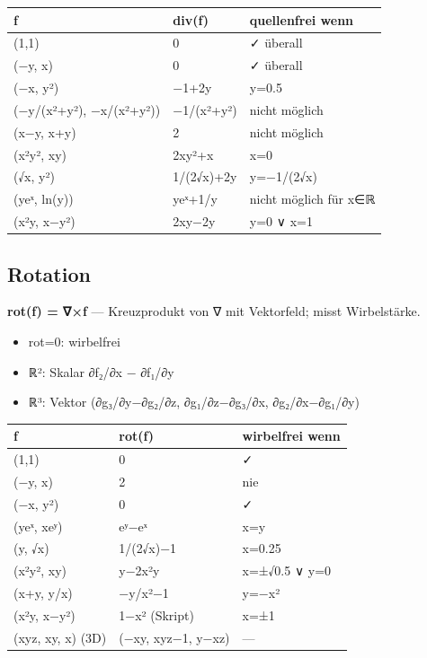 \documentclass[11pt, a4paper]{article}
\begin{document}
{\small
\begin{tabularx}{\linewidth}{XXX}
\hline
\rowcolor{tableheadbg}
{\color{white}\textbf{f}} & {\color{white}\textbf{div(f)}} & {\color{white}\textbf{quellenfrei wenn}} \\[2pt]
\hline
\endhead
\hline
\endfoot
(1,1) & 0 & ✓ überall \\
(−y, x) & 0 & ✓ überall \\
(−x, y²) & −1+2y & y=0.5 \\
(−y/(x²+y²), −x/(x²+y²)) & −1/(x²+y²) & nicht möglich \\
(x−y, x+y) & 2 & nicht möglich \\
(x²y², xy) & 2xy²+x & x=0 \\
(√x, y²) & 1/(2√x)+2y & y=−1/(2√x) \\
(yeˣ, ln(y)) & yeˣ+1/y & nicht möglich für x∈ℝ \\
(x²y, x−y²) & 2xy−2y & y=0 ∨ x=1 \\
\end{tabularx}
}



\subsection{Rotation}
\textbf{rot(f) = ∇×f} — Kreuzprodukt von ∇ mit Vektorfeld; misst Wirbelstärke.

\begin{itemize}
  \item rot=0: wirbelfrei
  \item ℝ²: Skalar ∂f₂/∂x − ∂f₁/∂y
  \item ℝ³: Vektor (∂g₃/∂y−∂g₂/∂z, ∂g₁/∂z−∂g₃/∂x, ∂g₂/∂x−∂g₁/∂y)
\end{itemize}


{\small
\begin{tabularx}{\linewidth}{XXX}
\hline
\rowcolor{tableheadbg}
{\color{white}\textbf{f}} & {\color{white}\textbf{rot(f)}} & {\color{white}\textbf{wirbelfrei wenn}} \\[2pt]
\hline
\endhead
\hline
\endfoot
(1,1) & 0 & ✓ \\
(−y, x) & 2 & nie \\
(−x, y²) & 0 & ✓ \\
(yeˣ, xeʸ) & eʸ−eˣ & x=y \\
(y, √x) & 1/(2√x)−1 & x=0.25 \\
(x²y², xy) & y−2x²y & x=±√0.5 ∨ y=0 \\
(x+y, y/x) & −y/x²−1 & y=−x² \\
(x²y, x−y²) & 1−x² (Skript) & x=±1 \\
(xyz, xy, x) (3D) & (−xy, xyz−1, y−xz) & — \\
\end{tabularx}
}
\end{document}
